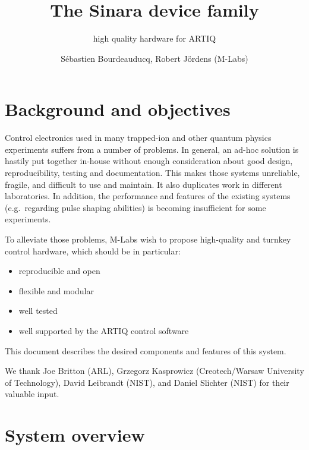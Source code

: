 \documentclass[11pt]{paper}
\begin{document}
\title{The Sinara device family}
\subtitle{high quality hardware for ARTIQ}
\author{S\'ebastien Bourdeauducq, Robert J\"ordens (M-Labs)}

\maketitle

\section{Background and objectives}
Control electronics used in many trapped-ion and other quantum physics experiments suffers from a number of problems. In general, an ad-hoc solution is hastily put together in-house without enough consideration about good design, reproducibility, testing and documentation. This makes those systems unreliable, fragile, and difficult to use and maintain. It also duplicates work in different laboratories. In addition, the performance and features of the existing systems (e.g.\ regarding pulse shaping abilities) is becoming insufficient for some experiments.

To alleviate those problems, M-Labs wish to propose high-quality and turnkey control hardware, which should be in particular:
\begin{itemize}
\item reproducible and open
\item flexible and modular
\item well tested
\item well supported by the ARTIQ control software
\end{itemize}

This document describes the desired components and features of this system.

We thank Joe Britton (ARL), Grzegorz Kasprowicz (Creotech/Warsaw University of Technology), David Leibrandt (NIST), and Daniel Slichter (NIST) for their valuable input.

\section{System overview}
\end{document}
